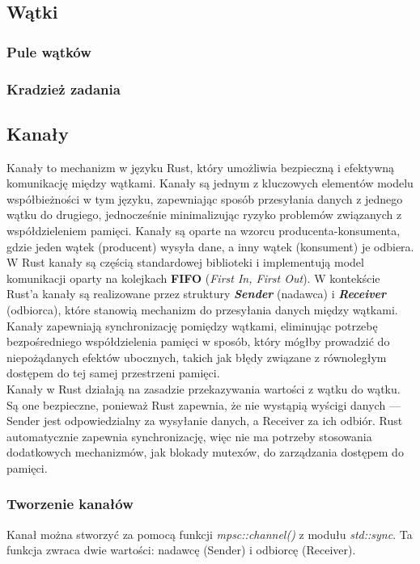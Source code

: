 \subsection{Wątki}
\subsubsection{Pule wątków }
\subsubsection{Kradzież zadania }
\subsection{Kanały}

Kanały  to mechanizm w języku Rust, który umożliwia bezpieczną i efektywną komunikację między wątkami. Kanały są jednym z kluczowych elementów modelu współbieżności w tym języku, zapewniając sposób przesyłania danych z jednego wątku do drugiego, jednocześnie minimalizując ryzyko problemów związanych z współdzieleniem pamięci. Kanały są oparte na wzorcu producenta-konsumenta, gdzie jeden wątek (producent) wysyła dane, a inny wątek (konsument) je odbiera.
\\

W Rust kanały są częścią standardowej biblioteki i implementują model komunikacji oparty na kolejkach \textbf{FIFO} (\textit{First In, First Out}). W kontekście Rust'a kanały są realizowane przez struktury \textbf{\textit{Sender}} (nadawca) i \textbf{\textit{Receiver}} (odbiorca), które stanowią mechanizm do przesyłania danych między wątkami. Kanały zapewniają synchronizację pomiędzy wątkami, eliminując potrzebę bezpośredniego współdzielenia pamięci w sposób, który mógłby prowadzić do niepożądanych efektów ubocznych, takich jak błędy związane z równoległym dostępem do tej samej przestrzeni pamięci.
\\

Kanały w Rust działają na zasadzie przekazywania wartości z wątku do wątku. Są one bezpieczne, ponieważ Rust zapewnia, że nie wystąpią wyścigi danych — Sender jest odpowiedzialny za wysyłanie danych, a Receiver za ich odbiór. Rust automatycznie zapewnia synchronizację, więc nie ma potrzeby stosowania dodatkowych mechanizmów, jak blokady mutexów, do zarządzania dostępem do pamięci.

\subsubsection{Tworzenie kanałów}
Kanał można stworzyć za pomocą funkcji \textit{mpsc::channel()} z modułu \textit{std::sync}. Ta funkcja zwraca dwie wartości: nadawcę (Sender) i odbiorcę (Receiver).

